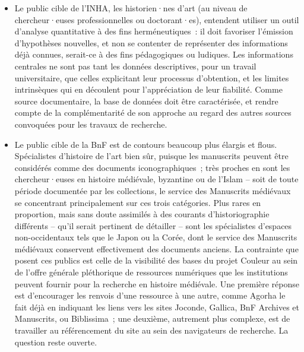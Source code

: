 \documentclass[a4paper,12pt, twoside]{book}
\begin{document}
\begin{itemize}
    \item Le public cible de l’INHA, les historien·nes d’art (au niveau de chercheur·euses professionnelles ou doctorant·es), entendent utiliser un outil d’analyse quantitative à des fins herméneutiques~: il doit favoriser l’émission d’hypothèses nouvelles, et non se contenter de représenter des informations déjà connues, serait-ce à des fins pédagogiques ou ludiques. Les informations centrales ne sont pas tant les données descriptives, pour un travail universitaire, que celles explicitant leur processus d’obtention, et les limites intrinsèques qui en découlent pour l’appréciation de leur fiabilité. Comme source documentaire, la base de données doit être caractérisée, et rendre compte de la complémentarité de son approche au regard des autres sources convoquées pour les travaux de recherche.\\

    \item Le public cible de la BnF est de contours beaucoup plus élargis et flous. Spécialistes d’histoire de l’art bien sûr, puisque les manuscrits peuvent être considérés comme des documents iconographiques~; très proches en sont les chercheur·euses en histoire médiévale, byzantine ou de l’Islam – soit de toute période documentée par les collections, le service des Manuscrits médiévaux se concentrant principalement sur ces trois catégories. Plus rares en proportion, mais sans doute assimilés à des courants d’historiographie différents – qu’il serait pertinent de détailler – sont les spécialistes d’espaces non-occidentaux tels que le Japon ou la Corée, dont le service des Manuscrits médiévaux conservent effectivement des documents anciens. La contrainte que posent ces publics est celle de la visibilité des bases du projet Couleur au sein de l’offre générale pléthorique de ressources numériques que les institutions peuvent fournir pour la recherche en histoire médiévale. Une première réponse est d’encourager les renvois d’une ressource à une autre, comme Agorha le fait déjà en indiquant les liens vers les sites Joconde, Gallica, BnF Archives et Manuscrits, ou Biblissima~; une deuxième, autrement plus complexe, est de travailler au référencement du site au sein des navigateurs de recherche. La question reste ouverte.
    
    \medskip
    

\end{itemize}
\end{document}
